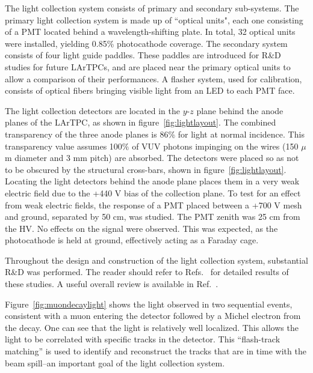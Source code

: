 The light collection system consists of primary and secondary sub-systems.  The primary light collection system is made up of ``optical units", each one consisting of a PMT located behind a wavelength-shifting plate.  In total, 32 optical units were installed, yielding 0.85\% photocathode coverage.  The secondary system consists of four light guide paddles.   These paddles are introduced for R\&D studies for future LArTPCs, and are placed near the primary optical units to allow a comparison of their performances.  A flasher system, used for calibration, consists of optical fibers bringing visible light from an LED to each PMT face.

The light collection detectors are located in the $y$-$z$ plane behind the anode planes of the LArTPC, as shown in figure~\ref{fig:lightlayout}.  The combined transparency of the three anode planes is 86\% for light at normal incidence.  This transparency value assumes 100$\%$ of VUV photons impinging on the wires (150 $\mu$m diameter and 3 mm pitch) are absorbed.  The detectors were placed so as not to be obscured by the \lartpc structural cross-bars, shown in figure~\ref{fig:lightlayout}.  Locating the light detectors behind the anode plane places them in a very weak electric field due to the +440 V bias of the collection plane.  To test for an effect from weak electric fields, the response of a PMT placed between a +700 V mesh and ground, separated by 50 cm, was studied.  The PMT zenith was 25 cm from the HV.   No effects on the signal were observed.  This was expected, as the photocathode is held at ground, effectively acting as a Faraday cage.  

Throughout the design and construction of the light collection system,  substantial R\&D was performed.   The reader should refer to Refs.~\cite{Bugel:2011xg,Katori:2011uq,Chiu:2012ju,Baptista:2012bf,Briese:2013wua,Jones:2013bca,Jones:2013mfa,Katori:2013wqa,Bromberg:2013fla,Moss:2014ota,Conrad:2015xta,Acciarri:2015hha,Moss:2015hha} for detailed results of these studies.    A useful overall review is available in Ref.~\cite{Benthesis}. 

Figure~\ref{fig:muondecaylight} shows the light observed in two sequential events, consistent with a muon entering the detector followed by a Michel electron from the decay.   One can see that the light is relatively well localized.   This allows the light to be correlated with specific tracks in the detector.  This ``flash-track matching'' is used to identify and reconstruct the tracks that are in time with the beam spill--an important goal of the light collection system.

